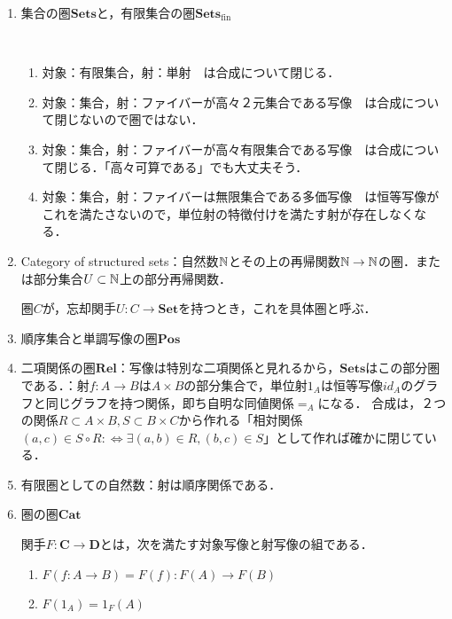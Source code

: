 \documentclass[uplatex, 12pt, dvipdfmx]{jsarticle}
\begin{document}
\begin{enumerate}
    \item 集合の圏$\mathbf{Sets}$と，有限集合の圏$\mathbf{Sets}_\mathrm{fin}$
    \begin{example*}　
        \begin{enumerate}[(1)]
            \item 対象：有限集合，射：単射　は合成について閉じる．
            \item 対象：集合，射：ファイバーが高々２元集合である写像　は合成について閉じないので圏ではない．
            \item 対象：集合，射：ファイバーが高々有限集合である写像　は合成について閉じる．「高々可算である」でも大丈夫そう．
            \item 対象：集合，射：ファイバーは無限集合である多価写像　は恒等写像がこれを満たさないので，単位射の特徴付けを満たす射が存在しなくなる．
        \end{enumerate}
    \end{example*}
    \item Category of structured sets：自然数$\mathbb{N}$とその上の再帰関数$\mathbb{N}\to\mathbb{N}$の圏．または部分集合$U\subset\mathbb{N}$上の部分再帰関数．
    \begin{definition*}[具体圏]
        圏$C$が，忘却関手$U:C\to\mathbf{Set}$を持つとき，これを具体圏と呼ぶ．
    \end{definition*}
    \item 順序集合と単調写像の圏$\mathbf{Pos}$
    \item 二項関係の圏$\mathbf{Rel}$：写像は特別な二項関係と見れるから，$\mathbf{Sets}$はこの部分圏である．：射$f:A\to B$は$A\times B$の部分集合で，単位射$1_A$は恒等写像$id_A$のグラフと同じグラフを持つ関係，即ち自明な同値関係$=_A$になる．
    合成は，２つの関係$R\subset A\times B, S\subset B\times C$から作れる「相対関係$(a,c)\in S\circ R:\Leftrightarrow \exists (a,b)\in R, (b,c)\in S$」として作れば確かに閉じている．
    \item 有限圏としての自然数：射は順序関係である．
    \item 圏の圏$\mathbf{Cat}$
    \begin{definition}[Functor]
        関手$F:\mathbf{C}\to\mathbf{D}$とは，次を満たす対象写像と射写像の組である．
        \begin{enumerate}[(1)]
            \item $F(f:A\to B)=F(f):F(A)\to F(B)$
            \item $F(1_A)=1_F(A)$

\end{enumerate}
\end{definition}
\end{enumerate}
\end{document}
